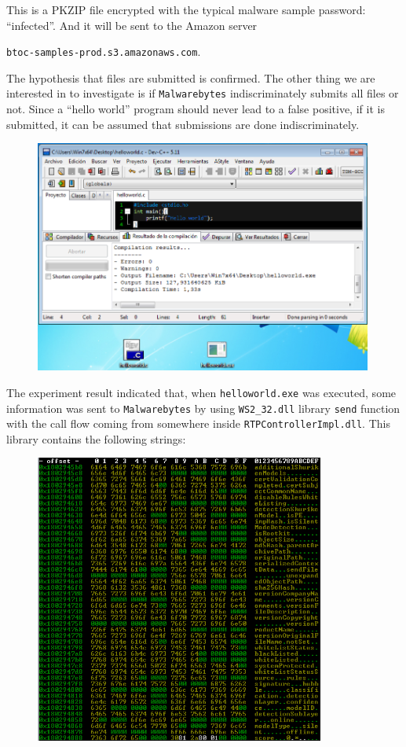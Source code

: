 \noindent This is a PKZIP file encrypted with the typical malware sample
password: ``infected''\cite{ZeltserShareMalware}.  And it will be sent to the Amazon server
\begin{tcolorbox}
  \texttt{btoc-samples-prod.s3.amazonaws.com}.
\end{tcolorbox}
The hypothesis that files are submitted is confirmed. The other thing we are
interested in to investigate is if \texttt{Malwarebytes} indiscriminately
submits all files or not.  Since a ``hello world'' program should never lead
to a false positive, if it is submitted, it can be assumed that submissions
are done indiscriminately.
\begin{figure}[h]
  \centering
  \includegraphics[width=0.99\textwidth]{./figures/HelloWorld}
\end{figure}

The experiment result indicated that, when \texttt{helloworld.exe} was
executed, some information was sent to \texttt{Malwarebytes} by using
\texttt{WS2\_32.dll} library \texttt{send} function with the call flow coming
from somewhere inside \texttt{RTPControllerImpl.dll}. This library contains
the following strings: \pagebreak
\begin{figure}[h]
  \centering
  \includegraphics[width=0.85\textwidth]{./figures/Strings}
\end{figure}

